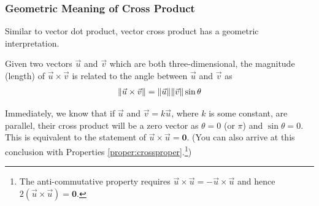 \subsubsection{Geometric Meaning of Cross Product} Similar to vector dot product, vector cross product has a geometric interpretation.
\begin{proper}
\label{proper:crossgeo}
Given two vectors $\vec{u}$ and $\vec{v}$ which are both three-dimensional, the magnitude (length) of $\vec{u} \times \vec{v}$ is related to the angle between $\vec{u}$ and $\vec{v}$ as
\begin{align*}
\norm{\vec{u} \times \vec{v}} = \norm{\vec{u}}\norm{\vec{v}}\sin\theta
\end{align*}
\end{proper}
Immediately, we know that if $\vec{u}$ and $\vec{v} = k\vec{u}$, where $k$ is some constant, are parallel, their cross product will be a zero vector as $\theta = 0$ (or $\pi$) and $\sin \theta = 0$. This is equivalent to the statement of $\vec{u} \times \vec{u} = \textbf{0}$. (You can also arrive at this conclusion with Properties \ref{proper:crossproper}.\footnote{The anti-commutative property requires $\vec{u}\times\vec{u} = -\vec{u}\times\vec{u}$ and hence $2(\vec{u}\times\vec{u}) = \textbf{0}$.})

